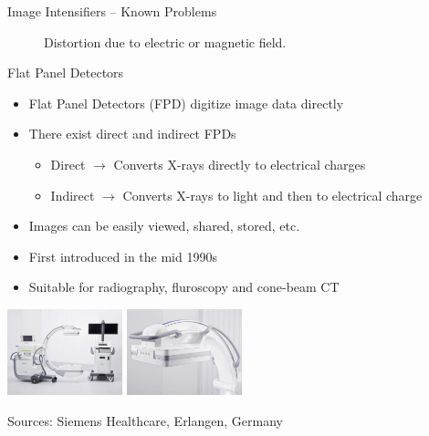 \begin{frame}{Image Intensifiers -- Known Problems}
\begin{figure}[tb]
\begin{minipage}[t]{0.272\columnwidth}
            \caption{Distortion due to electric or magnetic field.}
        \end{minipage}%
    \end{figure}
\end{frame}

\begin{frame}{Flat Panel Detectors}
    \begin{itemize}
        \item Flat Panel Detectors (FPD) digitize image data directly
        \item There exist direct and indirect FPDs
              \begin{itemize}
                  \item Direct $\rightarrow$ Converts X-rays directly to electrical charges
                  \item Indirect $\rightarrow$ Converts X-rays to light and then to electrical charge
              \end{itemize}
        \item Images can be easily viewed, shared, stored, etc.
        \item First introduced in the mid 1990s
        \item Suitable for radiography, fluroscopy and cone-beam CT
    \end{itemize}
    \vspace{0.25cm}
    \begin{center}
        \includegraphics[width=0.25\textwidth]{images/FlatPanelSiemens}\hspace{2cm}
        \includegraphics[width=0.25\textwidth]{images/FlatPanelSiemens2}
    \end{center}
    \begin{flushright}
        \scriptsize Sources: Siemens Healthcare, Erlangen, Germany
    \end{flushright}
\end{frame}


